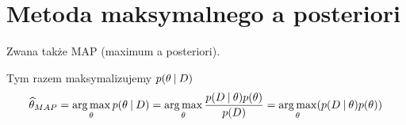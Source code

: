 \section{Metoda maksymalnego a posteriori}

Zwana także MAP (maximum a posteriori).

Tym razem maksymalizujemy \( p(\theta \:\vert\: D) \)
\[
	\map{\theta}
	= \argmax_\theta p(\theta \given D)
	= \argmax_\theta \frac{p(D \given \theta)p(\theta)}{p(D)}
	= \argmax_\theta \pars{p(D \given \theta)p(\theta)}
\]